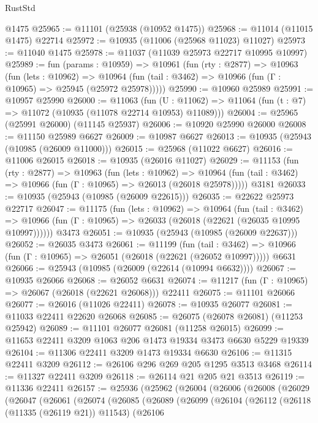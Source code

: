 \begin{lexlean}{RustStd}
\begin{coremodule}
{\begin{coremodule}
{{{{{{{{{{{{{{{{{{{{{{{{{{{{{{{{{{{{{{{{{{{{{{{{{{{{{{{{{{{{{{{{{{{{{{{{{{{{{{{{{{{{{    @1475
@25965 := @11101 (@25938 (@10952 @1475))
@25968 := @11014 (@11015 @1475) @22714
@25972 := @10935 (@11006 (@25968 @11023) @11027)
@25973 := @11040 @1475
@25978 := @11037 (@11039 @25973 @22717 @10995 @10997)
@25989 := fun (params : @10959) =>
  @10961
    (fun (rty : @2877) =>
    @10963
      (fun (lets : @10962) =>
      @10964 (fun (tail : @3462) => @10966 (fun (Γ : @10965) => @25945 (@25972 @25978)))))
@25990 := @10960 @25989
@25991 := @10957 @25990
@26000 := @11063
    (fun (U : @11062) => @11064 (fun (t : @7) => @11072 (@10935 (@11078 @22714 @10953) @11089)))
@26004 := @25965 (@25991 @26000) (@11145 @25937)
@26006 := @10920 @25990 @26000
@26008 := @11150 @25989 @6627
@26009 := @10987 @6627
@26013 := @10935 (@25943 (@10985 (@26009 @11000)))
@26015 := @25968 (@11022 @6627)
@26016 := @11006 @26015
@26018 := @10935 (@26016 @11027)
@26029 := @11153
    (fun (rty : @2877) =>
    @10963
      (fun (lets : @10962) =>
      @10964 (fun (tail : @3462) => @10966 (fun (Γ : @10965) => @26013 (@26018 @25978)))))
    @3181
@26033 := @10935 (@25943 (@10985 (@26009 @22615)))
@26035 := @22622 @25973 @22717
@26047 := @11175
    (fun (lets : @10962) =>
    @10964
      (fun (tail : @3462) =>
      @10966 (fun (Γ : @10965) => @26033 (@26018 (@22621 (@26035 @10995 @10997))))))
    @3473
@26051 := @10935 (@25943 (@10985 (@26009 @22637)))
@26052 := @26035 @3473
@26061 := @11199
    (fun (tail : @3462) => @10966 (fun (Γ : @10965) => @26051 (@26018 (@22621 (@26052 @10997)))))
    @6631
@26066 := @25943 (@10985 (@26009 (@22614 (@10994 @6632))))
@26067 := @10935 @26066
@26068 := @26052 @6631
@26074 := @11217 (fun (Γ : @10965) => @26067 (@26018 (@22621 @26068))) @22411
@26075 := @11101 @26066
@26077 := @26016 (@11026 @22411)
@26078 := @10935 @26077
@26081 := @11033 @22411 @22620 @26068
@26085 := @26075 (@26078 @26081) (@11253 @25942)
@26089 := @11101 @26077 @26081 (@11258 @26015)
@26099 := @11653 @22411 @3209 @1063 @206 @1473 @19334 @3473 @6630 @5229 @19339
@26104 := @11306 @22411 @3209 @1473 @19334 @6630
@26106 := @11315 @22411 @3209
@26112 := @26106 @296 @269 @205 @1295 @3513 @3468
@26114 := @11327 @22411 @3209
@26118 := @26114 @21 @205 @21 @3513
@26119 := @11336 @22411
@26157 := @25936
    (@25962
      (@26004
        (@26006
          (@26008
            (@26029
              (@26047
                (@26061
                  (@26074
                    (@26085
                      (@26089
                        (@26099
                          (@26104
                            (@26112
                              (@26118 (@11335 (@26119 @21)) @11543)
                              (@26106
}}}}}}}}}}}}}}}}}}}}}}}}}}}}}}}}}}}}}}}}}}}}}}}}}}}}}}}}}}}}}}}}}}}}}}}}}}}}}}}}}}}}}
\end{coremodule}}
\end{coremodule}
\end{lexlean}
